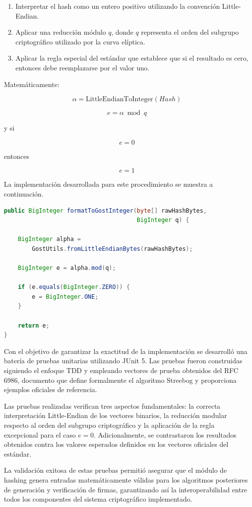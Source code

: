 \begin{enumerate}
    \item Interpretar el hash como un entero positivo utilizando la convención Little-Endian.
    \item Aplicar una reducción módulo $q$, donde $q$ representa el orden del subgrupo criptográfico utilizado por la curva elíptica.
    \item Aplicar la regla especial del estándar que establece que si el resultado es cero, entonces debe reemplazarse por el valor uno.
\end{enumerate}

Matemáticamente:

\[
\alpha = \text{LittleEndianToInteger}(Hash)
\]

\[
e = \alpha \bmod q
\]

y si

\[
e = 0
\]

entonces

\[
e = 1
\]

La implementación desarrollada para este procedimiento se muestra a continuación.

\begin{lstlisting}[language=Java, caption={Conversión del hash Streebog al entero utilizado por GOST.}]
public BigInteger formatToGostInteger(byte[] rawHashBytes,
                                      BigInteger q) {

    BigInteger alpha =
        GostUtils.fromLittleEndianBytes(rawHashBytes);

    BigInteger e = alpha.mod(q);

    if (e.equals(BigInteger.ZERO)) {
        e = BigInteger.ONE;
    }

    return e;
}
\end{lstlisting}

Con el objetivo de garantizar la exactitud de la implementación se desarrolló una batería de pruebas unitarias utilizando JUnit 5. Las pruebas fueron construidas siguiendo el enfoque TDD y empleando vectores de prueba obtenidos del RFC 6986, documento que define formalmente el algoritmo Streebog y proporciona ejemplos oficiales de referencia.

Las pruebas realizadas verifican tres aspectos fundamentales: la correcta interpretación Little-Endian de los vectores binarios, la reducción modular respecto al orden del subgrupo criptográfico y la aplicación de la regla excepcional para el caso $e=0$. Adicionalmente, se contrastaron los resultados obtenidos contra los valores esperados definidos en los vectores oficiales del estándar.

La validación exitosa de estas pruebas permitió asegurar que el módulo de hashing genera entradas matemáticamente válidas para los algoritmos posteriores de generación y verificación de firmas, garantizando así la interoperabilidad entre todos los componentes del sistema criptográfico implementado.